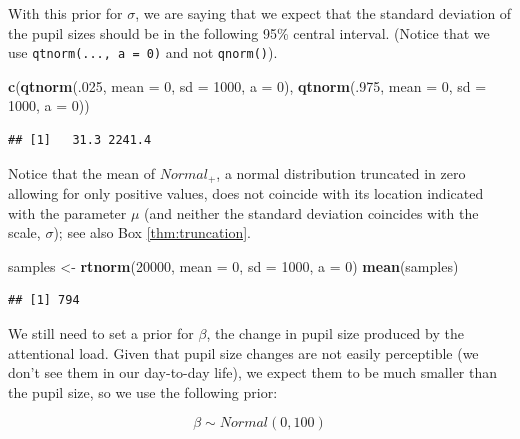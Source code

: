 \documentclass[12pt,]{krantz}
\newenvironment{Shaded}{\begin{snugshade}}{\end{snugshade}}
\newcommand{\KeywordTok}[1]{\textcolor[rgb]{0.13,0.29,0.53}{\textbf{#1}}}
\newcommand{\DataTypeTok}[1]{\textcolor[rgb]{0.13,0.29,0.53}{#1}}
\newcommand{\DecValTok}[1]{\textcolor[rgb]{0.00,0.00,0.81}{#1}}
\newcommand{\StringTok}[1]{\textcolor[rgb]{0.31,0.60,0.02}{#1}}
\newcommand{\NormalTok}[1]{#1}
\theoremstyle{definition}
\theoremstyle{definition}
\theoremstyle{definition}
\theoremstyle{remark}
\begin{document}
With this prior for \(\sigma\), we are saying that we expect that the
standard deviation of the pupil sizes should be in the following 95\%
central interval. (Notice that we use \texttt{qtnorm(...,\ a\ =\ 0)} and
not \texttt{qnorm()}).

\begin{Shaded}
\begin{Highlighting}[]
\KeywordTok{c}\NormalTok{(}\KeywordTok{qtnorm}\NormalTok{(.}\DecValTok{025}\NormalTok{, }\DataTypeTok{mean =} \DecValTok{0}\NormalTok{, }\DataTypeTok{sd =} \DecValTok{1000}\NormalTok{, }\DataTypeTok{a =} \DecValTok{0}\NormalTok{),}
  \KeywordTok{qtnorm}\NormalTok{(.}\DecValTok{975}\NormalTok{, }\DataTypeTok{mean =} \DecValTok{0}\NormalTok{, }\DataTypeTok{sd =} \DecValTok{1000}\NormalTok{, }\DataTypeTok{a =} \DecValTok{0}\NormalTok{))}
\end{Highlighting}
\end{Shaded}

\begin{verbatim}
## [1]   31.3 2241.4
\end{verbatim}

Notice that the mean of \(Normal_+\), a normal distribution truncated in
zero allowing for only positive values, does not coincide with its
location indicated with the parameter \(\mu\) (and neither the standard
deviation coincides with the scale, \(\sigma\)); see also Box
\ref{thm:truncation}.

\begin{Shaded}
\begin{Highlighting}[]
\NormalTok{samples <-}\StringTok{ }\KeywordTok{rtnorm}\NormalTok{(}\DecValTok{20000}\NormalTok{, }\DataTypeTok{mean =} \DecValTok{0}\NormalTok{, }\DataTypeTok{sd =} \DecValTok{1000}\NormalTok{, }\DataTypeTok{a =} \DecValTok{0}\NormalTok{)}
\KeywordTok{mean}\NormalTok{(samples)}
\end{Highlighting}
\end{Shaded}

\begin{verbatim}
## [1] 794
\end{verbatim}

We still need to set a prior for \(\beta\), the change in pupil size
produced by the attentional load. Given that pupil size changes are not
easily perceptible (we don't see them in our day-to-day life), we expect
them to be much smaller than the pupil size, so we use the following
prior:

\begin{equation}
\beta \sim Normal(0, 100)
\end{equation}
\end{document}
